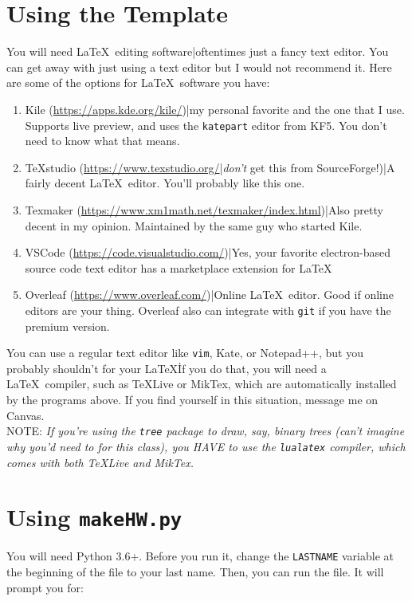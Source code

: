 \documentclass[a4paper,10pt]{article}
\begin{document}
\section{Using the Template}

You will need \LaTeX\ editing software|oftentimes just a fancy text editor. You can get away with just using a text editor but I would not recommend it. Here are some of the options for \LaTeX\ software you have:
\begin{enumerate}
	\item Kile (\url{https://apps.kde.org/kile/})|my personal favorite and the one that I use. Supports live preview, and uses the \texttt{katepart} editor from KF5. You don't need to know what that means.
	\item TeXstudio (\url{https://www.texstudio.org/}|\emph{don't} get this from SourceForge!)|A fairly decent \LaTeX\ editor. You'll probably like this one.
	\item Texmaker (\url{https://www.xm1math.net/texmaker/index.html})|Also pretty decent in my opinion. Maintained by the same guy who started Kile.
	\item VSCode (\url{https://code.visualstudio.com/})|Yes, your favorite electron-based source code text editor has a marketplace extension for \LaTeX\!
	\item Overleaf (\url{https://www.overleaf.com/})|Online \LaTeX\ editor. Good if online editors are your thing. Overleaf also can integrate with \texttt{git} if you have the premium version.
\end{enumerate}

\noindent You can use a regular text editor like \texttt{vim}, Kate, or Notepad++, but you probably shouldn't for your \LaTeX\. If you do that, you will need a \LaTeX\ compiler, such as TeXLive or MikTex, which are automatically installed by the programs above. If you find yourself in this situation, message me on Canvas.
\\[10pt]
NOTE:\textit{
If you're using the \texttt{tree} package to draw, say, binary trees (can't imagine why you'd need to for this class), you HAVE to use the \texttt{lualatex} compiler, which comes with both TeXLive and MikTex.
}

\section{Using \texttt{makeHW.py}}

You will need Python 3.6+. Before you run it, change the \texttt{LASTNAME} variable at the beginning of the file to your last name. Then, you can run the file. It will prompt you for:
\end{document}

